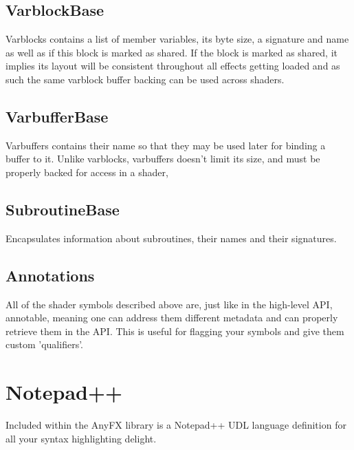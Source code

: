 \documentclass{article}
\begin{document}
\subsection{VarblockBase}
Varblocks contains a list of member variables, its byte size, a signature and name as well as if this block is marked as shared. If the block is marked as shared, it implies its layout will be consistent throughout all effects getting loaded and as such the same varblock buffer backing can be used across shaders. 

\subsection{VarbufferBase}
Varbuffers contains their name so that they may be used later for binding a buffer to it. Unlike varblocks, varbuffers doesn't limit its size, and must be properly backed for access in a shader,

\subsection{SubroutineBase}
Encapsulates information about subroutines, their names and their signatures.

\subsection{Annotations}
All of the shader symbols described above are, just like in the high-level API, annotable, meaning one can address them different metadata and can properly retrieve them in the API. This is useful for flagging your symbols and give them custom 'qualifiers'. 

\section{Notepad++}
Included within the AnyFX library is a Notepad++ UDL language definition for all your syntax highlighting delight. 
\end{document}
